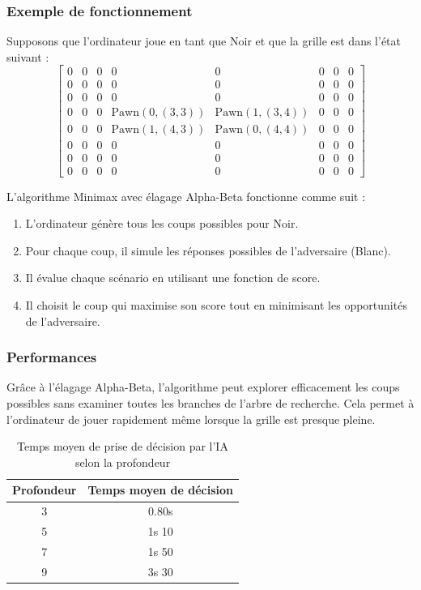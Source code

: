 \documentclass[a4paper,12pt]{article}
\begin{document}
\subsubsection{Exemple de fonctionnement}
Supposons que l'ordinateur joue en tant que Noir et que la grille est dans l'état suivant :
\[
\begin{bmatrix}
    0 & 0 & 0 & 0 & 0 & 0 & 0 & 0\\
    0 & 0 & 0 & 0 & 0 & 0 & 0 & 0\\
    0 & 0 & 0 & 0 & 0 & 0 & 0 & 0\\
    0 & 0 & 0 & \text{Pawn}(0, (3,3)) & \text{Pawn}(1, (3,4)) & 0 & 0 & 0\\
    0 & 0 & 0 & \text{Pawn}(1, (4,3)) & \text{Pawn}(0, (4,4)) & 0 & 0 & 0\\
    0 & 0 & 0 & 0 & 0 & 0 & 0 & 0\\
    0 & 0 & 0 & 0 & 0 & 0 & 0 & 0\\
    0 & 0 & 0 & 0 & 0 & 0 & 0 & 0
\end{bmatrix}
\]

L'algorithme Minimax avec élagage Alpha-Beta fonctionne comme suit :
\begin{enumerate}
    \item L'ordinateur génère tous les coups possibles pour Noir.
    \item Pour chaque coup, il simule les réponses possibles de l'adversaire (Blanc).
    \item Il évalue chaque scénario en utilisant une fonction de score.
    \item Il choisit le coup qui maximise son score tout en minimisant les opportunités de l'adversaire.
\end{enumerate}

\subsubsection{Performances}
Grâce à l'élagage Alpha-Beta, l'algorithme peut explorer efficacement les coups possibles sans examiner toutes les branches de l'arbre de recherche. Cela permet à l'ordinateur de jouer rapidement même lorsque la grille est presque pleine.

\begin{table}[H]
    \centering
    \renewcommand{\arraystretch}{2} %
    \begin{tabular}{|c|c|}
        \hline
        \rowcolor{blue!40} \textbf{Profondeur} & \textbf{Temps moyen de décision} \\
        \hline
        \rowcolor{blue!30} 3 & 0.80s \\
        \hline
        \rowcolor{blue!30} 5 & 1s 10 \\
        \hline
        \rowcolor{blue!30} 7 & 1s 50 \\
        \hline
        \rowcolor{blue!30} 9 & 3s 30 \\
        \hline
    \end{tabular}
\caption{Temps moyen de prise de décision par l'IA selon la profondeur}
\end{table}
\end{document}
